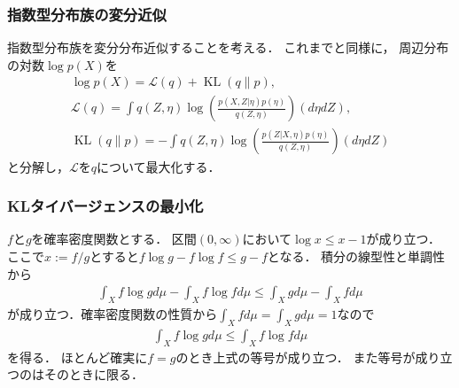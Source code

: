 \documentclass[10pt,usepdftitle=false,hyperref={unicode}]{beamer}
\DeclareMathOperator*{\KL}{KL}
\newcommand{\parentheses}[1]{\left(#1\right)}
\newcommand{\braces}[1]{\left\{#1\right\}}
\newcommand{\brackets}[1]{\left[#1\right]}
\newcommand{\energy}{\mathcal{L}}
\begin{document}
\begin{frame}
\frametitle{指数型分布族の変分近似}
指数型分布族を変分分布近似することを考える．
これまでと同様に，
周辺分布の対数$\log p\parentheses{X}$を
\begin{gather*}
    \log p\parentheses{X} = \energy\parentheses{q} + \KL\parentheses{q\|p}, \\
    \energy\parentheses{q} = \int q\parentheses{Z,\eta}
    \log \parentheses{\frac{p\parentheses{X,Z |\eta}p\parentheses{\eta}}{q\parentheses{Z,\eta}}} \parentheses{d{\eta}dZ}, \\
    \KL\parentheses{q \| p} = - \int q\parentheses{Z,\eta}
    \log \parentheses{\frac{p\parentheses{Z|X, \eta}p\parentheses{\eta}}{q\parentheses{Z,\eta}}} \parentheses{d{\eta}dZ}
\end{gather*}
と分解し，$\energy$を$q$について最大化する．
\end{frame}

\begin{frame}
\frametitle{KLタイバージェンスの最小化}
$f$と$g$を確率密度関数とする．
区間$\parentheses{0,\infty}$において$\log x \leq x - 1$が成り立つ．
ここで$x := f/g$とすると$f \log g - f \log f \leq g - f$となる．
積分の線型性と単調性から
\begin{align*}
    \int_X f \log g d\mu - \int_X f \log f d\mu \leq \int_X g d\mu - \int_X f d\mu
\end{align*}
が成り立つ．確率密度関数の性質から$\int_X f d\mu = \int_X g d\mu = 1$なので
\begin{align*}
    \int_X f \log g d\mu \leq \int_X f \log f d\mu
\end{align*}
を得る．
ほとんど確実に$f = g$のとき上式の等号が成り立つ．
また等号が成り立つのはそのときに限る．\nocite{bogachev2007measure}
\end{frame}

\end{document}
